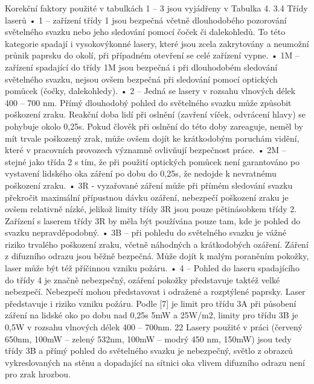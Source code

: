 Korekční faktory použité v tabulkách 1 – 3 jsou vyjádřeny v Tabulka 4.
3.4 Třídy laserů
• 1 – zařízení třídy 1 jsou bezpečná včetně dlouhodobého pozorování světelného
svazku nebo jeho sledování pomocí čoček či dalekohledů. To této kategorie spadají
i vysokovýkonné lasery, které jsou zcela zakrytovány a neumožní průnik paprsku
do okolí, při případném otevření se celé zařízení vypne.
• 1M – zařízení spadající do třídy 1M jsou bezpečná i při dlouhodobém sledování
světelného svazku, nejsou ovšem bezpečná při sledování pomocí optických
pomůcek (čočky, dalekohledy).
• 2 – Jedná se lasery v rozsahu vlnových délek 400 – 700 nm. Přímý dlouhodobý
pohled do světelného svazku může způsobit poškození zraku. Reakční doba lidí při
oslnění (zavření víček, odvrácení hlavy) se pohybuje okolo 0,25s. Pokud člověk při
oslnění do této doby zareaguje, neměl by mít trvale poškozený zrak, může ovšem
dojít ke krátkodobým poruchám vidění, které v pracovních provozech významně
ovlivňují bezpečnost práce.
• 2M – stejné jako třída 2 s tím, že při použití optických pomůcek není garantováno
po vystavení lidského oka záření po dobu do 0,25s, že nedojde k nevratnému
poškození zraku.
• 3R - vyzařované záření může při přímém sledování svazku překročit maximální
přípustnou dávku ozáření, nebezpečí poškození zraku je ovšem relativně nízké,
jelikož limity třídy 3R jsou pouze pětinásobkem třídy 2. Zařízení s laserem třídy
3R by měla být používána pouze tam, kde je pohled do svazku nepravděpodobný.
• 3B – při pohledu do světelného svazku je vážné riziko trvalého poškození zraku,
včetně náhodných a krátkodobých ozáření. Záření z difuzního odrazu jsou běžně
bezpečná. Může dojít k malým poraněním pokožky, laser může být též příčinnou
vzniku požáru.
• 4 – Pohled do laseru spadajícího do třídy 4 je značně nebezpečný, ozáření pokožky
představuje taktéž velké nebezpečí. Nebezpečí mohou představovat i odražené a
rozptýlené paprsky. Laser představuje i riziko vzniku požáru.
Podle [7] je limit pro třídu 3A při působení záření na lidské oko po dobu nad 0,25s 5mW a
25W/m2, limity pro třídu 3B je 0,5W v rozsahu vlnových délek 400 – 700nm.
22
Lasery použité v práci (červený 650nm, 100mW – zelený 532nm, 100mW – modrý 450
nm, 150mW) jsou tedy třídy 3B a přímý pohled do světelného svazku je nebezpečný, světlo z
obrazců vykreslovaných na stěnu a dopadající na sítnici oka vlivem difuzního odrazu není pro
zrak hrozbou.